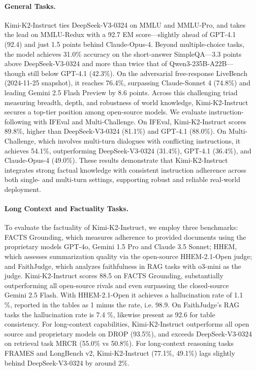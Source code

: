 \paragraph{General Tasks.}
Kimi-K2-Instruct ties DeepSeek-V3-0324 on MMLU and MMLU-Pro, and takes the lead on MMLU-Redux with a 92.7 EM score—slightly ahead of GPT-4.1 (92.4) and just 1.5 points behind Claude-Opus-4. 
Beyond multiple-choice tasks, the model achieves 31.0\% accuracy on the short-answer SimpleQA—3.3 points above DeepSeek-V3-0324 and more than twice that of Qwen3-235B-A22B—though still below GPT-4.1 (42.3\%). On the adversarial free-response LiveBench (2024-11-25 snapshot), it reaches 76.4\%, surpassing Claude-Sonnet 4 (74.8\%) and leading Gemini 2.5 Flash Preview by 8.6 points. Across this challenging triad measuring breadth, depth, and robustness of world knowledge, Kimi-K2-Instruct secures a top-tier position among open-source models.
We evaluate instruction-following with IFEval and Multi-Challenge. On IFEval, Kimi-K2-Instruct scores 89.8\%, higher than DeepSeek-V3-0324 (81.1\%) and GPT-4.1 (88.0\%). On Multi-Challenge, which involves multi-turn dialogues with conflicting instructions, it achieves 54.1\%, outperforming DeepSeek-V3-0324 (31.4\%), GPT-4.1 (36.4\%), and Claude-Opus-4 (49.0\%).
These results demonstrate that Kimi-K2-Instruct integrates strong factual knowledge with consistent instruction adherence across both single- and multi-turn settings, supporting robust and reliable real-world deployment.


\paragraph{Long Context and Factuality Tasks.}



To evaluate the factuality of Kimi-K2-Instruct, we employ three benchmarks: FACTS Grounding, which measures adherence to provided documents using the proprietary models GPT-4o, Gemini 1.5 Pro and Claude 3.5 Sonnet; HHEM, which assesses summarization quality via the open-source HHEM-2.1-Open judge; and FaithJudge, which analyzes faithfulness in RAG tasks with o3-mini as the judge. Kimi-K2-Instruct scores 88.5 on FACTS Grounding, substantially outperforming all open-source rivals and even surpassing the closed-source Gemini 2.5 Flash. With HHEM-2.1-Open it achieves a hallucination rate of 1.1 \%, reported in the tables as 1 minus the rate, i.e. 98.9. On FaithJudge's RAG tasks the hallucination rate is 7.4 \%, likewise present as 92.6 for table consistency.
For long-context capabilities, Kimi-K2-Instruct outperforms all open source and proprietary models on DROP (93.5\%), and exceeds DeepSeek-V3-0324 on retrieval task MRCR (55.0\% vs 50.8\%).  
For long-context reasoning tasks FRAMES and LongBench v2, Kimi-K2-Instruct (77.1\%, 49.1\%) lags slightly behind DeepSeek-V3-0324 by around 2\%.


